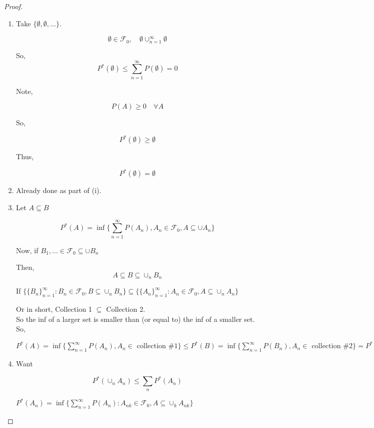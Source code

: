 \documentclass[11pt,fleqn]{book} %
\begin{document}
\begin{proof}
	
	\begin{enumerate}[label = (\roman*)]
		\item Take $\{\emptyset, \emptyset, \dots \}$. 

		$$\emptyset \in \mathscr{F}_0, \quad \emptyset \cup^\infty_{n=1} \emptyset $$

		So, \\
		$$P^*(\emptyset) \leq \displaystyle \sum^\infty_{n=1} P(\emptyset) = 0$$

		Note,

		$$P(A) \geq 0 \quad \forall A$$

		So, 

		$$P^*(\emptyset) \geq \emptyset$$ 

		Thus,

		 $$P^*(\emptyset) = \emptyset$$
		\item  Already done as part of (i).

		\item  Let $A \subseteq B$

		$$P^*(A) = \inf\{\displaystyle \sum^\infty_{n=1} P(A_n), A_n \in \mathscr{F}_0, A \subseteq \cup A_n \} $$

		Now, if $B_1, \dots \in \mathscr{F}_0 \subseteq \cup B_n$

		Then, 
		$$A \subseteq B \subseteq \cup_n B_n $$

		If  $\{ \{B_n\}^\infty_{n=1}: B_n \in \mathscr{F}_0, B \subseteq \cup_n B_n \} \subseteq \{ \{A_n\}^\infty_{n=1}: A_n \in \mathscr{F}_0, A \subseteq \cup_n A_n \}$

		Or in short, Collection 1 $\subseteq$ Collection 2.\\

		So the inf of a larger set is smaller than (or equal to) the inf of a smaller set.\\
		
		So, 

		$P^*(A) = \inf\{\displaystyle \sum^\infty_{n=1} P(A_n), A_n \in  \text{ collection \#1}\} \leq P^*(B) = \inf\{\displaystyle \sum^\infty_{n=1} P(B_n), A_n \in  \text{ collection \#2}\} = P^*(B)$

		\item Want 

		$$P^*(\cup_n A_n) \leq \displaystyle\sum_n P^*(A_n) $$

		$P^*(A_n) = \inf \{\displaystyle \sum_{n=1}^\infty P(A_n): A_{nk} \in \mathscr{F}_0,  A \subseteq \cup_{k} A_{nk}\}$\\


\end{enumerate}
\end{proof}
\end{document}
